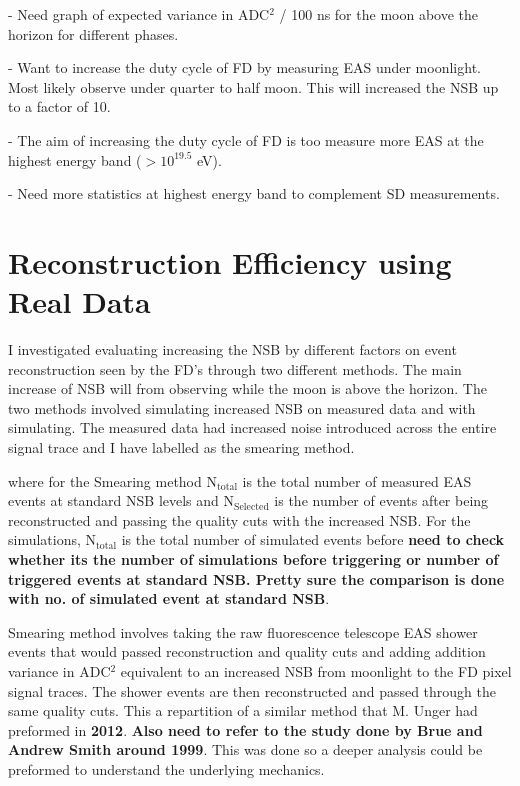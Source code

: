 - Need graph of expected variance in ADC$^2$ / 100 ns for the moon above the horizon for different phases.

- Want to increase the duty cycle of FD by measuring EAS under moonlight. Most likely observe under quarter to half moon. This will increased the NSB up to a factor of 10.

- The aim of increasing the duty cycle of FD is too measure more EAS at the highest energy band ($> 10^{19.5}$ eV).

- Need more statistics at highest energy band to complement SD measurements.


\section{Reconstruction Efficiency using Real Data}

I investigated evaluating increasing the NSB by different factors on event reconstruction seen by the FD's through two different methods. The main increase of NSB will from observing while the moon is above the horizon. The two methods involved simulating increased NSB on measured data and with simulating. The measured data had increased noise introduced across the entire signal trace and I have labelled as the smearing method.

where for the Smearing method N$_{\mathrm{total}}$ is the total number of measured EAS events at standard NSB levels and N$_{\mathrm{Selected}}$ is the number of events after being reconstructed and passing the quality cuts with the increased NSB. For the simulations, N$_{\mathrm{total}}$ is the total number of simulated events before \textbf{need to check whether its the number of simulations before triggering or number of triggered events at standard NSB. Pretty sure the comparison is done with no. of simulated event at standard NSB}.

Smearing method involves taking the raw fluorescence telescope EAS shower events that would passed reconstruction and quality cuts and adding addition variance in ADC$^2$ equivalent to an increased NSB from moonlight to the FD pixel signal traces. The shower events are then reconstructed and passed through the same quality cuts. This a repartition of a similar method that M. Unger had preformed in \textbf{2012}. \textbf{Also need to refer to the study done by Brue and Andrew Smith around 1999}. This was done so a deeper analysis could be preformed to understand the underlying mechanics. 

